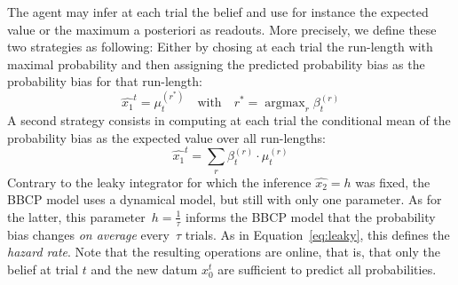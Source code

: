 \documentclass[12pt,english]{article}%
\newcommand{\eql}[1]{\begin{equation}#1\end{equation}}
\DeclareMathOperator{\argmax}{argmax}
\newcommand{\seeEq}[1]{Equation~\ref{eq:#1}}
\begin{document}
The agent may infer at each trial the belief
and use for instance the expected value or the maximum a posteriori as readouts.
More precisely, we define these two strategies as following:
Either by chosing
at each trial the run-length with maximal probability
and then assigning the predicted probability bias
as the probability bias for that run-length:
\eql{
\hat{x_1}^t = \mu^{(r^\ast)}_{t} \quad \text{with} \quad r^\ast = \argmax_r \beta^{(r)}_{t}
}
A second strategy consists in computing
at each trial the conditional mean of the probability bias
as the expected value over all run-lengths:
\eql{
\hat{x_1}^t = \sum_{r} \beta^{(r)}_{t} \cdot \mu^{(r)}_{t}
}
Contrary to the leaky integrator for which the inference $\hat{x_2}=h$ was fixed,
the BBCP model uses a dynamical model, but still with only one parameter.
As for the latter, this parameter~$h=\frac 1 \tau$ informs the BBCP model
that the probability bias  changes \emph{on average} every~$\tau$ trials.
As in \seeEq{leaky}, this defines the \emph{hazard rate}.
Note that the resulting operations are online, that is,
that only the belief at trial $t$ and the new datum $x_0^t$
are sufficient to predict all probabilities.
\end{document}
